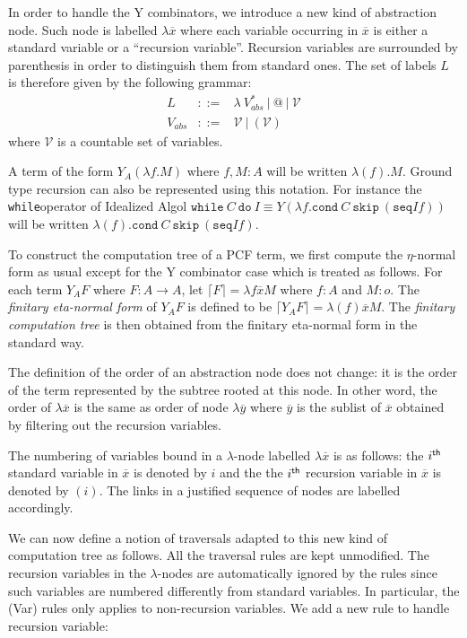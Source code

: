 \documentclass{article}
\newcommand{\aux}[1]{\lceil #1\rceil}
\newcommand{\syneq}{\equiv}
\newcommand\iaseq{\texttt{seq}}
\newcommand\iaskip{\texttt{skip}}
\newcommand\iawhile{\texttt{while}}
\newcommand\iado{\texttt{do}}
\newcommand\pcfcond{\texttt{cond}}
\begin{document}
In order to handle the Y combinators, we introduce a new kind of abstraction node. Such node is labelled $\lambda \overline{x}$ where each variable occurring in $\overline{x}$ is either a standard variable or a ``recursion variable''.
Recursion variables are surrounded by parenthesis in order to distinguish them from standard ones. The set of labels $L$ is therefore given by the following grammar:
\begin{eqnarray*}
L &::=& \lambda\ V_{abs}^*\ |\ @\ |\ \mathcal{V} \\
V_{abs} &::=& \mathcal{V}\ |\ (\mathcal{V})
\end{eqnarray*}
where $\mathcal{V}$ is a countable set of variables.


A term of the form $Y_A (\lambda f. M)$ where $f,M:A$ will be written  $\lambda (f) . M$. Ground type recursion can also be represented using this notation. For instance the \iawhile operator of Idealized Algol 
$\iawhile\ C\ \iado\ I \syneq Y( \lambda f. \pcfcond\ C\ \iaskip\ (\iaseq I f))$ will be written $\lambda (f) . \pcfcond\ C\ \iaskip\ (\iaseq I f)$.


To construct the computation tree of a PCF term, we first compute the $\eta$-normal form as usual except for the Y combinator case which is treated as follows. 
For each term $Y_A F$ where $F:A\rightarrow A$, let  $\aux{F} = \lambda f \overline{x} M$ where $f:A$ and $M:o$. The \emph{finitary eta-normal form} of $Y_A F$ is defined to be
$\aux{Y_A F} = \lambda (f) \overline{x} M$.
The \emph{finitary computation tree} is then obtained from the finitary eta-normal form in the standard way.

The definition of the  order of an abstraction node does not change: it is the order of the term represented by the subtree rooted at this node. In other word, the order 
of $\lambda \overline{x}$ is the same as order of node $\lambda \overline{y}$ where $\overline{y}$ is the sublist of $\overline{x}$ obtained by filtering out the recursion variables.

The numbering of variables bound in a $\lambda$-node labelled $\lambda \overline{x}$ is as follows: the $i^{\sf th}$ standard variable in $\overline{x}$ is denoted by $i$ and the
the $i^{\sf th}$ recursion variable in $\overline{x}$ 
is denoted by $(i)$. The links in a justified sequence of nodes are labelled accordingly.

We can now define a notion of traversals adapted to this new kind of computation tree as follows. All the traversal rules are kept unmodified. The recursion variables in the $\lambda$-nodes are automatically ignored by the rules since such variables are numbered differently from standard variables. In particular, the (Var) rules only applies to non-recursion variables. 
We add a new rule to handle recursion variable:
\end{document}
